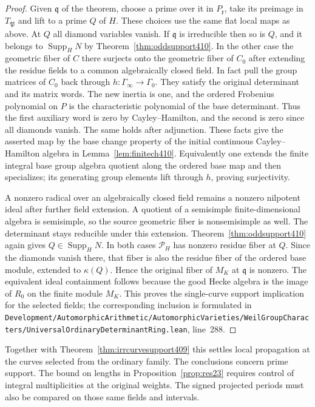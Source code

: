 \documentclass[a4paper,11pt]{article}
\theoremstyle{definition}
\theoremstyle{remark}
\newcommand{\srcloc}[2]{{\small\nolinkurl{#1.lean}}, line~#2}
\numberwithin{equation}{section}
\begin{document}
\begin{proof}
Given \(\mathfrak q\) of the theorem, choose a prime over it
in \(P_{\mathfrak x}\), take its preimage in \(T_{\mathfrak P}\)
and lift to a prime \(Q\) of \(H\). These choices use the
same flat local maps as above. At \(Q\) all diamond
variables vanish. If \(\mathfrak q\) is irreducible then
so is \(Q\), and it belongs to \(\operatorname{Supp}_H N\)
by Theorem~\ref{thm:oddsupport410}. In the other case the
geometric fiber of \(C\) there surjects onto the geometric
fiber of \(C_0\) after extending the residue fields to a
common algebraically closed field. In fact pull the group
matrices of \(C_0\) back through \(h:\Gamma_\infty\to
\Gamma_0\). They satisfy the original determinant and its
matrix words. The new inertia is one, and the ordered
Frobenius polynomial on \(P\) is the characteristic
polynomial of the base determinant. Thus the first auxiliary
word is zero by Cayley--Hamilton, and the second is zero
since all diamonds vanish. The same holds after adjunction.
These facts give the asserted map by the base change property
of the initial continuous Cayley--Hamilton algebra in
Lemma~\ref{lem:finitech410}. Equivalently one extends the
finite integral base group algebra quotient along the
ordered base map and then specializes; its generating group
elements lift through \(h\), proving surjectivity.

A nonzero radical over an algebraically closed field remains
a nonzero nilpotent ideal after further field extension.
A quotient of a semisimple finite-dimensional algebra is
semisimple, so the source geometric fiber is nonsemisimple
as well. The determinant stays reducible under this
extension. Theorem~\ref{thm:oddsupport410} again gives
\(Q\in\operatorname{Supp}_H N\). In both cases
\(\mathcal P_H\) has nonzero residue fiber at \(Q\).
Since the diamonds vanish there, that fiber is also the
residue fiber of the ordered base module, extended to
\(\kappa(Q)\). Hence the original fiber of \(M_K\) at
\(\mathfrak q\) is nonzero. The equivalent ideal
containment follows because the good Hecke algebra is
the image of \(R_0\) on the finite module \(M_K\).
This proves the single-curve support implication for the
selected fields; the corresponding inclusion is formulated
in \srcloc{Development/AutomorphicArithmetic/AutomorphicVarieties/WeilGroupCharacters/UniversalOrdinaryDeterminantRing}{288}.
\end{proof}

Together with Theorem~\ref{thm:irrcurvesupport409} this
settles local propagation at the curves selected from the
ordinary family. The conclusions concern prime support.
The bound on lengths in Proposition~\ref{prop:res23}
requires control of integral multiplicities at the original
weights. The signed projected periods must also be compared
on those same fields and intervals.
\end{document}
